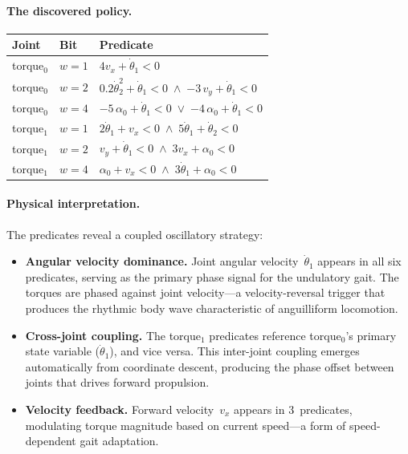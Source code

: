 \documentclass[9pt,a4paper]{article}
\theoremstyle{plain}
\theoremstyle{definition}
\theoremstyle{remark}
\begin{document}
\paragraph{The discovered policy.}

\begin{center}
\small
\begin{tabular}{@{}llp{8.5cm}@{}}
\toprule
\textbf{Joint} & \textbf{Bit} & \textbf{Predicate} \\
\midrule
torque$_0$ & $w{=}1$ & $4 v_x + \dot\theta_1 < 0$ \\
torque$_0$ & $w{=}2$ & $0.2 \dot\theta_2^2 + \dot\theta_1 < 0 \;\land\; {-3}\, v_y + \dot\theta_1 < 0$ \\
torque$_0$ & $w{=}4$ & ${-5}\, \alpha_0 + \dot\theta_1 < 0 \;\lor\; {-4}\, \alpha_0 + \dot\theta_1 < 0$ \\
\midrule
torque$_1$ & $w{=}1$ & $2 \dot\theta_1 + v_x < 0 \;\land\; 5 \dot\theta_1 + \dot\theta_2 < 0$ \\
torque$_1$ & $w{=}2$ & $v_y + \dot\theta_1 < 0 \;\land\; 3 v_x + \alpha_0 < 0$ \\
torque$_1$ & $w{=}4$ & $\alpha_0 + v_x < 0 \;\land\; 3 \dot\theta_1 + \alpha_0 < 0$ \\
\bottomrule
\end{tabular}
\end{center}

\paragraph{Physical interpretation.}
The predicates reveal a coupled oscillatory strategy:
\begin{itemize}
\item \textbf{Angular velocity dominance.}
  Joint angular velocity~$\dot\theta_1$ appears in all six predicates,
  serving as the primary phase signal for the undulatory gait.
  The torques are phased against joint velocity---a
  velocity-reversal trigger that produces the rhythmic
  body wave characteristic of anguilliform locomotion.

\item \textbf{Cross-joint coupling.}
  The torque$_1$ predicates reference torque$_0$'s
  primary state variable ($\dot\theta_1$), and vice versa.
  This inter-joint coupling emerges automatically from
  coordinate descent, producing the phase offset between
  joints that drives forward propulsion.

\item \textbf{Velocity feedback.}
  Forward velocity~$v_x$ appears in 3~predicates,
  modulating torque magnitude based on current speed---a
  form of speed-dependent gait adaptation.
\end{itemize}
\end{document}
